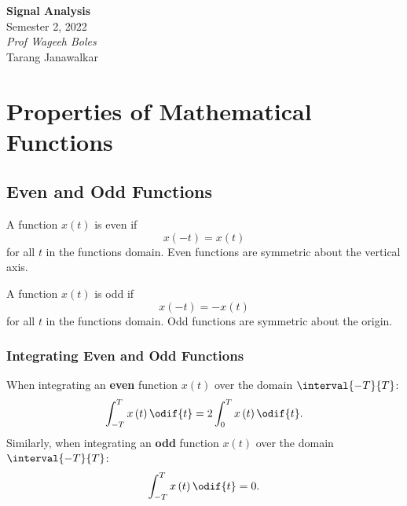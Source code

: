 \documentclass{article}
\date{}
\newcommand{\unitName}{Signal Analysis}
\newcommand{\unitTime}{Semester 2, 2022}
\newcommand{\unitCoordinator}{Prof Wageeh Boles}
\newcommand{\documentAuthors}{Tarang Janawalkar}
\begin{document}
%
\begin{titlepage}
    \vspace*{\fill}
    \begin{center}
        \LARGE{\textbf{\unitName}} \\[0.1in]
        \normalsize{\unitTime} \\[0.2in]
        \normalsize\textit{\unitCoordinator} \\[0.2in]
        \documentAuthors
    \end{center}
    \vspace*{\fill}
    \doclicenseThis
    \thispagestyle{empty}
\end{titlepage}
\newpage
%
\tableofcontents
\newpage
%
\section{Properties of Mathematical Functions}
\subsection{Even and Odd Functions}
\begin{definition}
    A function \(x\left( t \right)\) is even if
    \begin{equation*}
        x\left( -t \right) = x\left( t \right)
    \end{equation*}
    for all \(t\) in the functions domain. Even functions are symmetric about the vertical axis.
\end{definition}
\begin{definition}
    A function \(x\left( t \right)\) is odd if
    \begin{equation*}
        x\left( -t \right) = -x\left( t \right)
    \end{equation*}
    for all \(t\) in the functions domain. Odd functions are symmetric about the origin.
\end{definition}
\subsubsection{Integrating Even and Odd Functions}
When integrating an \textbf{even} function \(x\left( t \right)\) over the domain \(\interval{-T}{T}\):
\begin{equation*}
    \int_{-T}^T x\left( t \right) \odif{t} = 2 \int_0^T x\left( t \right) \odif{t}.
\end{equation*}
Similarly, when integrating an \textbf{odd} function \(x\left( t \right)\) over the domain \(\interval{-T}{T}\):
\begin{equation*}
    \int_{-T}^T x\left( t \right) \odif{t} = 0.
\end{equation*}
\end{document}
